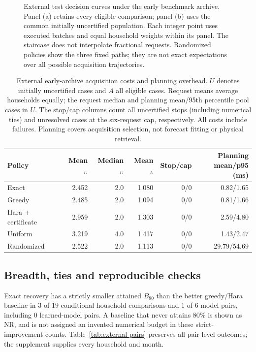 \documentclass[12pt]{article}
\begin{document}
\begin{figure}[htbp]
\caption{External test decision curves under the early benchmark archive. Panel (a) retains every eligible comparison; panel (b) uses the common initially uncertified population. Each integer point uses executed batches and equal household weights within its panel. The staircase does not interpolate fractional requests. Randomized policies show the three fixed paths; they are not exact expectations over all possible acquisition trajectories.}
\label{fig:external-stopping}
\end{figure}
\begin{table}[htbp]
\centering\small\setlength{\tabcolsep}{4pt}
\caption{External early-archive acquisition costs and planning overhead. $U$ denotes initially uncertified cases and $A$ all eligible cases. Request means average households equally; the request median and planning mean/95th percentile pool cases in $U$. The stop/cap columns count all uncertified stops (including numerical ties) and unresolved cases at the six-request cap, respectively. All costs include failures. Planning covers acquisition selection, not forecast fitting or physical retrieval.}
\label{tab:external-costs}
\begin{tabular}{lrrrrr}
\toprule
Policy & Mean$_U$ & Median$_U$ & Mean$_A$ & Stop/cap & \shortstack{Planning\\mean/p95 (ms)}\\
\midrule
Exact & 2.452 & 2.0 & 1.080 & 0/0 & 0.82/1.65\\
Greedy & 2.485 & 2.0 & 1.094 & 0/0 & 0.81/1.66\\
Hara + certificate & 2.959 & 2.0 & 1.303 & 0/0 & 2.59/4.80\\
Uniform & 3.219 & 4.0 & 1.417 & 0/0 & 1.43/2.47\\
Randomized & 2.522 & 2.0 & 1.113 & 0/0 & 29.79/54.69\\
\bottomrule
\end{tabular}
\end{table}
\FloatBarrier
\subsection{Breadth, ties and reproducible checks}
Exact recovery has a strictly smaller attained $B_{80}$ than the better greedy/Hara baseline in 3 of 19 conditional household comparisons and 1 of 6 model pairs, including 0 learned-model pairs. A baseline that never attains 80\% is shown as NR, and is not assigned an invented numerical budget in these strict-improvement counts. Table~\ref{tab:external-pairs} preserves all pair-level outcomes; the supplement supplies every household and month.
\end{document}
